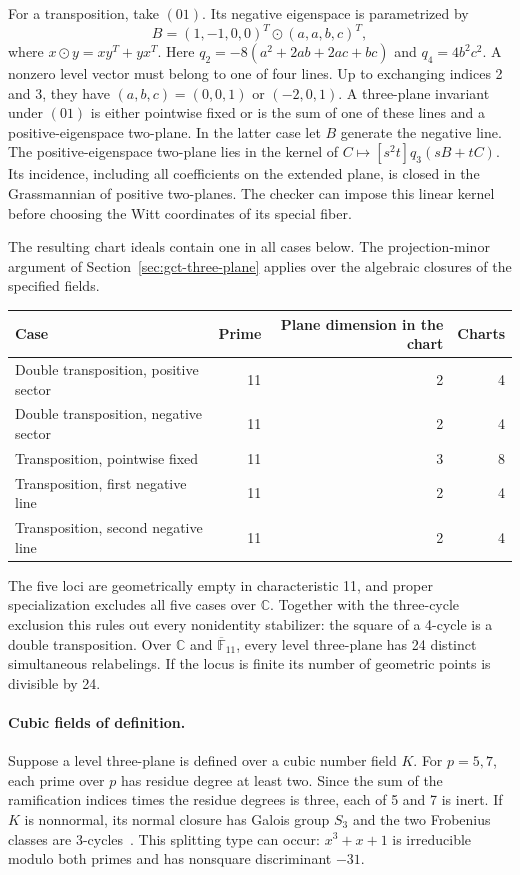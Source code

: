 For a transposition, take \((01)\). Its negative eigenspace is
parametrized by
\begin{equation*}
 B=(1,-1,0,0)^T\odot(a,a,b,c)^T,
\end{equation*}
where \(x\odot y=xy^T+yx^T\). Here \(q_2=-8(a^2+2ab+2ac+bc)\)
and \(q_4=4b^2c^2\). A nonzero level vector must belong to one of
four lines. Up to exchanging indices 2 and 3, they have
\((a,b,c)=(0,0,1)\) or \((-2,0,1)\).
A three-plane invariant under \((01)\) is either pointwise fixed or
is the sum of one of these lines and a positive-eigenspace two-plane.
In the latter case let \(B\) generate the negative line. The
positive-eigenspace two-plane lies in the kernel of
\(C\mapsto[s^2t]q_3(sB+tC)\). Its incidence, including all coefficients
on the extended plane, is closed in the Grassmannian of positive
two-planes. The checker can impose this linear kernel before choosing
the Witt coordinates of its special fiber.

The resulting chart ideals contain one in all cases below. The
projection-minor argument of Section~\ref{sec:gct-three-plane}
applies over the algebraic closures of the specified fields.
\begin{center}
\begin{tabular}{@{}lrrr@{}}
\toprule
Case & Prime & Plane dimension in the chart & Charts\\
\midrule
Double transposition, positive sector & 11 & 2 & 4\\
Double transposition, negative sector & 11 & 2 & 4\\
Transposition, pointwise fixed & 11 & 3 & 8\\
Transposition, first negative line & 11 & 2 & 4\\
Transposition, second negative line & 11 & 2 & 4\\
\bottomrule
\end{tabular}
\end{center}
The five loci are geometrically empty in characteristic 11, and
proper specialization excludes all five cases over \(\mathbb C\).
Together with the three-cycle exclusion this rules out every
nonidentity stabilizer: the square of a 4-cycle is a double
transposition. Over \(\mathbb C\) and \(\overline{\mathbb F}_{11}\),
every level three-plane has 24 distinct simultaneous relabelings.
If the locus is finite its number of geometric points is divisible
by 24.

\paragraph{Cubic fields of definition.}
Suppose a level three-plane is defined over a cubic number field \(K\).
For \(p=5,7\), each prime over \(p\) has residue degree at least two.
Since the sum of the ramification indices times the residue degrees
is three, each of 5 and 7 is inert. If \(K\) is nonnormal, its normal
closure has Galois group \(S_3\) and the two Frobenius classes are
3-cycles~\cite[Section~2.1]{sutherlandarithmetic}. This splitting type
can occur: \(x^3+x+1\) is irreducible modulo both primes and has
nonsquare discriminant \(-31\).

